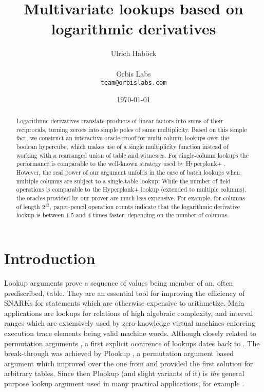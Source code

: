 \documentclass[11pt]{article}
\author{%
Ulrich Hab{\"o}ck
\\\\
Orbis Labs
\\
\texttt{team@orbislabs.com}
}
\theoremstyle{definition}
\theoremstyle{remark}
\begin{document}
\title{%
Multivariate lookups based on
logarithmic derivatives
}
\date{%
\today
}
\maketitle



\begin{abstract}
Logarithmic derivatives translate products of linear factors into sums of their reciprocals, turning zeroes into simple poles of same multiplicity.
Based on this simple fact, we construct an interactive oracle proof for multi-column lookups over the boolean hypercube, which makes use of a single multiplicity function instead of working with a rearranged union of table and witnesses.
For single-column lookups the performance is comparable to the well-known \cite{Plookup} strategy used by Hyperplonk+ \cite{Hyperplonk}.
However, the real power of our argument unfolds in the case of batch lookups when multiple columns are subject to a single-table lookup:  
While the number of field operations is comparable to the Hyperplonk+ lookup (extended to multiple columns), the oracles provided by our prover are much less expensive. 
For example, for columns of length $2^{12}$, paper-pencil operation counts indicate that the logarithmic derivative lookup is between $1.5$ and $4$ times faster, depending on the number of columns.
\end{abstract}


 \tableofcontents

\section{Introduction}

Lookup arguments prove a sequence of values being member of an, often prediscribed, table. 
They are an essential tool for improving the efficiency of SNARKs for statements which are otherwise expensive to arithmetize. 
Main applications are lookups for relations of high algebraic complexity, and interval ranges which are extensively used by zero-knowledge virtual machines enforcing execution trace elements being valid machine words.
Although closely related to permutation arguments \cite{shuffle, RAMs}, a first explicit occurence of lookups dates back to \cite{Arya}.
The break-through was achieved by Plookup \cite{Plookup}, a permutation argument based argument which improved over the one from \cite{Arya} and provided the first solution for arbitrary tables. 
Since then Plookup (and slight variants of it) is \textit{the} general purpose lookup argument used in many practical applications, for example \cite{Aztek, Halo2, Arkworks, Cairo, Miden}. 
\end{document}
